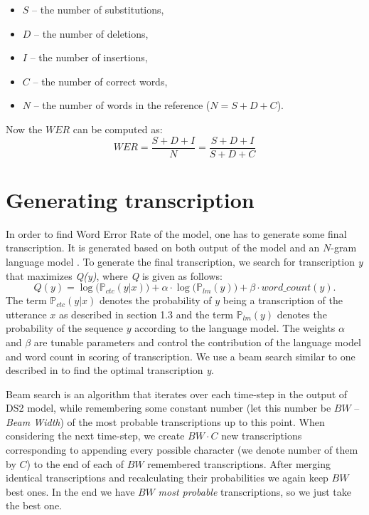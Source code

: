 \documentclass[licencjacka,en]{pracamgr}
\begin{document}
\begin{itemize}
  \item $S$ -- the number of substitutions,
  \item $D$ -- the number of deletions,
  \item $I$ -- the number of insertions,
  \item $C$ -- the number of correct words,
  \item $N$ -- the number of words in the reference ($N=S+D+C$).
\end{itemize}
Now the $WER$ can be computed as:
$$
WER = \frac{S + D + I}{N} = \frac{S + D + I}{S + D + C}
$$

\section{Generating transcription} \label{sec:transcription}
In order to find Word Error Rate of the model, one has to generate some final transcription. It is generated based on both output of the model and an $N$-gram language model \cite{DS9}. To generate the final transcription, we search for transcription \textit{y} that maximizes \textit{Q(y)}, where \textit{Q} is given as follows:
$$
Q(y) = \log \big(\mathbb{P}_{ctc}(y|x)\big) + \alpha \cdot \log \big( \mathbb{P}_{lm}(y) \big) + \beta \cdot word\_count(y).
$$
The term $\mathbb{P}_{ctc}(y|x)$ denotes the probability of $y$ being a transcription of the utterance $x$ as described in section 1.3 and the term $\mathbb{P}_{lm}(y)$ denotes the probability of the sequence $y$ according to the language model. The weights $\alpha$ and $\beta$ are tunable parameters and control the contribution of the language model and word count in scoring of transcription. We use a beam search similar to one described in \cite{DS7} to find the optimal transcription \textit{y}.

Beam search is an algorithm that iterates over each time-step in the output of DS2 model, while remembering some constant number (let this number be $BW$ -- \textit{Beam Width}) of the most probable transcriptions up to this point. When considering the next time-step, we create $BW \cdot C$ new transcriptions corresponding to appending every possible character (we denote number of them by $C$) to the end of each of $BW$ remembered transcriptions. After merging identical transcriptions and recalculating their probabilities we again keep $BW$ best ones. In the end we have $BW$ \textit{most probable} transcriptions, so we just take the best one.
\end{document}
